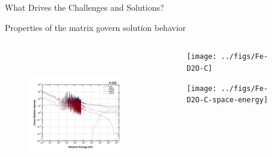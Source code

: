 \documentclass[xcolor=x11names,compress]{beamer}
\renewcommand{\(}{\begin{columns}}
\renewcommand{\)}{\end{columns}}
\newcommand{\<}[1]{\begin{column}{#1}}
\renewcommand{\>}{\end{column}}
\begin{document}
\begin{frame}{What Drives the Challenges and Solutions?}
    
    \vspace*{1 em}
    	\textcolor{dgreen}{Properties of the matrix} govern solution behavior
    	
    \begin{columns}
    \begin{column}{0.55\textwidth}     
 	   \begin{center}
 	   \begin{figure}
 	   \includegraphics[height=2.25in,clip]{../figs/u235-xsecs}
       \end{figure}
 	   \end{center}
  	\end{column}
 	\begin{column}{0.4\textwidth}
 	   \begin{center}
 	   \begin{figure}     
 	   \texttt{[image: ../figs/Fe-D2O-C]}
 	   \end{figure}
 	   \begin{figure} 
 	   \texttt{[image: ../figs/Fe-D2O-C-space-energy]}
       \end{figure}
 	   \end{center}
  	\end{column}
	\end{columns}
	
\end{frame}
\end{document}
